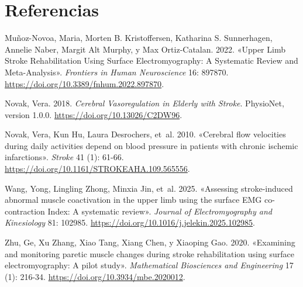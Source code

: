 \documentclass[
  spanish,
  a4paper,
  DIV=11,
  numbers=noendperiod]{scrreprt}
\newlength{\cslhangindent}
\newenvironment{CSLReferences}[2] %
 {\begin{list}{}{%
  \setlength{\itemindent}{0pt}
  \setlength{\leftmargin}{0pt}
  \setlength{\parsep}{0pt}
  \ifodd #1
   \setlength{\leftmargin}{\cslhangindent}
   \setlength{\itemindent}{-1\cslhangindent}
  \fi
  \setlength{\itemsep}{#2\baselineskip}}}
 {\end{list}}
\begin{document}
\chapter{Referencias}\label{referencias}

\protect{}\label{refs}
\begin{CSLReferences}{1}{1}
Muñoz-Novoa, Maria, Morten B. Kristoffersen, Katharina S. Sunnerhagen,
Annelie Naber, Margit Alt Murphy, y Max Ortiz-Catalan. 2022. {«Upper
Limb Stroke Rehabilitation Using Surface Electromyography: A Systematic
Review and Meta-Analysis»}. \emph{Frontiers in Human Neuroscience} 16:
897870. \url{https://doi.org/10.3389/fnhum.2022.897870}.

Novak, Vera. 2018. \emph{Cerebral Vasoregulation in Elderly with
Stroke}. PhysioNet, version 1.0.0.
\url{https://doi.org/10.13026/C2DW96}.

Novak, Vera, Kun Hu, Laura Desrochers, et~al. 2010. {«Cerebral flow
velocities during daily activities depend on blood pressure in patients
with chronic ischemic infarctions»}. \emph{Stroke} 41 (1): 61-66.
\url{https://doi.org/10.1161/STROKEAHA.109.565556}.

Wang, Yong, Lingling Zhong, Minxia Jin, et~al. 2025. {«Assessing
stroke-induced abnormal muscle coactivation in the upper limb using the
surface EMG co-contraction Index: A systematic review»}. \emph{Journal
of Electromyography and Kinesiology} 81: 102985.
\url{https://doi.org/10.1016/j.jelekin.2025.102985}.

Zhu, Ge, Xu Zhang, Xiao Tang, Xiang Chen, y Xiaoping Gao. 2020.
{«Examining and monitoring paretic muscle changes during stroke
rehabilitation using surface electromyography: A pilot study»}.
\emph{Mathematical Biosciences and Engineering} 17 (1): 216-34.
\url{https://doi.org/10.3934/mbe.2020012}.

\end{CSLReferences}
\end{document}
